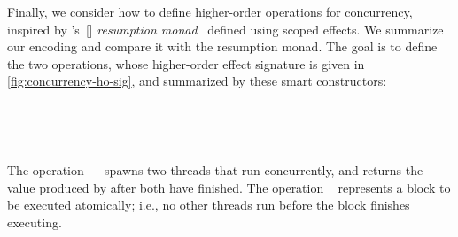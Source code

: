 Finally, we consider how to define higher-order operations for concurrency, inspired by \citeauthor{YangPWBS22}'s~[\citeyear{YangPWBS22}] \emph{resumption monad}~\citep{Claessen99,Schmidt1986denotational,PirogG14} defined using scoped effects.
We summarize our encoding and compare it with the resumption monad. The goal is to define the two operations, whose higher-order effect signature is given in \cref{fig:concurrency-ho-sig}, and summarized by these smart constructors:
%
%
\begin{code}[hide]%
\>[0][@{}l@{\AgdaIndent{1}}]%
\>[2]\AgdaSpace{}%
\AgdaModule{\AgdaUnderscore{}}\AgdaSpace{}%
\AgdaSpace{}%
\AgdaSpace{}%
\AgdaSymbol{:}\AgdaSpace{}%
\AgdaSpace{}%
\AgdaSpace{}%
\<%
\\
\>[2][@{}l@{\AgdaIndent{0}}]%
\>[4]\<%
\end{code}
\begin{code}%
\>[4][@{}l@{\AgdaIndent{1}}]%
\>[6]%
\>[16]\AgdaSymbol{:}\AgdaSpace{}%
\AgdaSymbol{\{}\AgdaSpace{}%
\AgdaSymbol{:}\AgdaSpace{}%
\AgdaSymbol{\}}\AgdaSpace{}%
\AgdaSpace{}%
\AgdaSymbol{(}\AgdaSpace{}%
\AgdaSpace{}%
\AgdaSymbol{:}\AgdaSpace{}%
\AgdaSpace{}%
\AgdaSpace{}%
\AgdaSpace{}%
\AgdaSpace{}%
\AgdaSymbol{)}%
\>[57]\AgdaSpace{}%
\AgdaSpace{}%
\AgdaSpace{}%
\AgdaSpace{}%
\AgdaSpace{}%
\<%
\\
%
\>[6]%
\>[16]\AgdaSymbol{:}\AgdaSpace{}%
\AgdaSymbol{\{}\AgdaSpace{}%
\AgdaSymbol{:}\AgdaSpace{}%
\AgdaSymbol{\}}\AgdaSpace{}%
\AgdaSpace{}%
\AgdaSpace{}%
\AgdaSpace{}%
\AgdaSpace{}%
\AgdaSpace{}%
%
\>[57]\AgdaSpace{}%
\AgdaSpace{}%
\AgdaSpace{}%
\AgdaSpace{}%
\AgdaSpace{}%
\<%
\end{code}
%
The operation ~~ spawns two threads that run concurrently, and returns the value produced by  after both have finished.
The operation ~ represents a block to be executed atomically; i.e., no other threads run before the block finishes executing.

